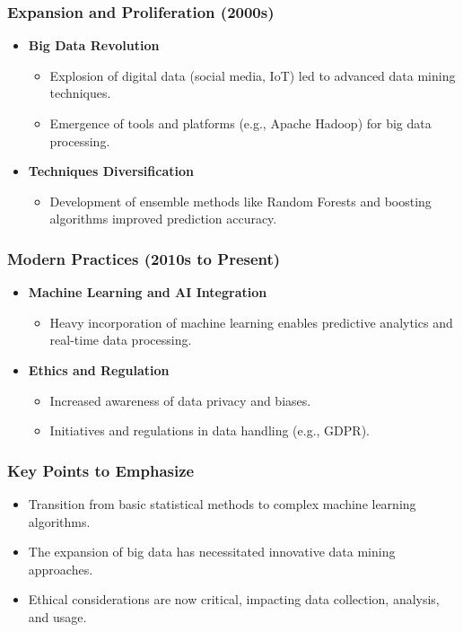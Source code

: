 \documentclass[aspectratio=169]{beamer}
\begin{document}
\begin{frame}[fragile]
    \frametitle{Expansion and Proliferation (2000s)}
    \begin{itemize}
        \item \textbf{Big Data Revolution}
            \begin{itemize}
                \item Explosion of digital data (social media, IoT) led to advanced data mining techniques.
                \item Emergence of tools and platforms (e.g., Apache Hadoop) for big data processing.
            \end{itemize}
        \item \textbf{Techniques Diversification}
            \begin{itemize}
                \item Development of ensemble methods like Random Forests and boosting algorithms improved prediction accuracy.
            \end{itemize}
    \end{itemize}
\end{frame}

\begin{frame}[fragile]
    \frametitle{Modern Practices (2010s to Present)}
    \begin{itemize}
        \item \textbf{Machine Learning and AI Integration}
            \begin{itemize}
                \item Heavy incorporation of machine learning enables predictive analytics and real-time data processing.
            \end{itemize}
        \item \textbf{Ethics and Regulation}
            \begin{itemize}
                \item Increased awareness of data privacy and biases.
                \item Initiatives and regulations in data handling (e.g., GDPR).
            \end{itemize}
    \end{itemize}
\end{frame}

\begin{frame}[fragile]
    \frametitle{Key Points to Emphasize}
    \begin{itemize}
        \item Transition from basic statistical methods to complex machine learning algorithms.
        \item The expansion of big data has necessitated innovative data mining approaches.
        \item Ethical considerations are now critical, impacting data collection, analysis, and usage.
    \end{itemize}
\end{frame}
\end{document}
